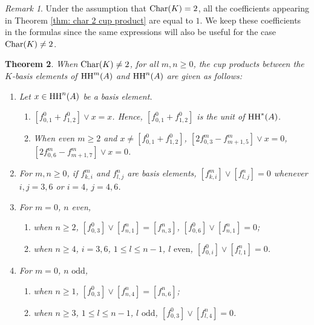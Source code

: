 \documentclass[10pt, reqno]{amsart}
\newtheorem{theorem}{Theorem}[section]
\theoremstyle{definition}
\theoremstyle{remark}
\newtheorem{remark}[theorem]{Remark}
\numberwithin{equation}{section}
\begin{document}
\begin{remark} 
Under the assumption that \(\mathrm{Char}(K)=2\), all the coefficients appearing in Theorem \ref{thm: char 2 cup product} are equal to \(1\). We keep these coefficients in the formulas since the same expressions will also be useful for the case \(\mathrm{Char}(K)\neq2\). 
\end{remark}

\begin{theorem}\label{thm: char neq 2 cup product}
    When \(\mathrm{Char}(K)\neq 2\), for all \(m,n \ge 0\), the cup products between the \(K\)-basis elements of $\mathrm{HH}^m(A)$ and $\mathrm{HH}^n(A)$ are  given as follows:
    \begin{enumerate}
        \item Let $x\in \mathrm{HH}^n(A)$ be a basis element.
             \begin{enumerate}
                 \item $[f_{0,1}^0+f_{1,2}^0]\lor x=x$. Hence, $[f_{0,1}^0+f_{1,2}^0]$ is the unit of $\mathrm{HH}^*(A)$.
                 \item When even $m\ge 2$ and $
                 x \neq [f_{0,1}^0+f_{1,2}^0]$, $[2f_{0,3}^m-f_{m+1,5}^m]\lor x=0$, $[2f_{0,6}^m-f_{m+1,7}^m]\lor x=0$.
             \end{enumerate}
        \item For $m, n\ge 0$, if \(f_{k,i}^m\) and \(f_{l,j}^n\) are basis elements, $[f_{k,i}^m]\lor[f_{l,j}^n]=0$ whenever \(i,j=3,6\) or \(i=4\), \(j=4,6\).
        \item For \(m=0\), \(n\) even,
            \begin{enumerate}
              \item when \(n\ge 2\), $[f_{0,3}^0]\lor [f_{n,1}^n]=[f_{n,3}^{n}]$, $[f_{0,6}^0]\lor [f_{n,1}^n]=0$;
              \item  when \(n\ge 4\), \(i=3,6\), \(1\le l\le n-1\), \(l\text{ even}\), \([f_{0,i}^0]\lor [f_{l,1}^n]=0\).
                \end{enumerate}
            
        \item For $m=0$, $n \text{ odd}$,
            \begin{enumerate}
                \item when \(n\ge 1\),  $[f_{0,3}^0]\lor [f_{n,4}^n]= [f_{n,6}^{n}]$;

                \item when \(n\ge 3\), \(1\le l\le n-1\), \(l\text{ odd}\), \([f_{0,3}^0]\lor [f_{l,4}^n]=0\).
            \end{enumerate}
  

\end{enumerate}
\end{theorem}
\end{document}
